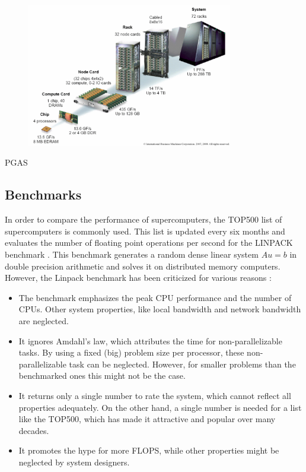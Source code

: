 \begin{figure}[h]
	\centering
	\includegraphics[width=0.8\textwidth]{architecture.png}
	\caption{} 
	\label{fig:finite_differences}
\end{figure}

PGAS \cite{coarfa2005evaluation}

\subsection{Benchmarks}
In order to compare the performance of supercomputers, the TOP500 list of supercomputers is commonly used. This list is updated every six months and evaluates the number of floating point operations per second for the LINPACK benchmark \cite{linpack}. This benchmark generates a random dense linear system $Au = b$ in double precision arithmetic and solves it on distributed memory computers. However, the Linpack benchmark has been criticized for various reasons \cite{dongarra2007hpc}:
\begin{itemize}
\item The benchmark emphasizes the peak CPU performance and the number of CPUs. Other system properties, like local bandwidth and network bandwidth are neglected.
\item It ignores Amdahl's law, which attributes the time for non-parallelizable tasks. By using a fixed (big) problem size per processor, these non-parallelizable task can be neglected. However, for smaller problems than the benchmarked ones this might not be the case.
\item It returns only a single number to rate the system, which cannot reflect all properties adequately. On the other hand, a single number is needed for a list like the TOP500, which has made it attractive and popular over many decades.
\item It promotes the hype for more FLOPS, while other properties might be neglected by system designers.  
\end{itemize}

